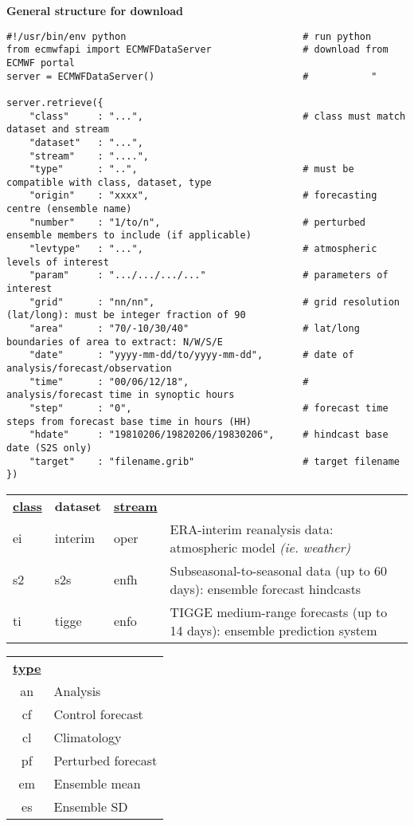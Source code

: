 \documentclass[10pt,fleqn]{article}
\begin{document}
\begin{framed}
\textbf{General structure for download}
\begin{lstlisting}
#!/usr/bin/env python								# run python
from ecmwfapi import ECMWFDataServer				# download from ECMWF portal
server = ECMWFDataServer()							# 			"
    
server.retrieve({
    "class"     : "...",							# class must match dataset and stream
    "dataset"   : "...",
   	"stream"    : "....",							
    "type"      : "..",								# must be compatible with class, dataset, type
    "origin"	: "xxxx",							# forecasting centre (ensemble name)
    "number"	: "1/to/n",							# perturbed ensemble members to include (if applicable)
    "levtype"   : "...",							# atmospheric levels of interest
    "param"     : ".../.../.../..."					# parameters of interest
    "grid"      : "nn/nn",							# grid resolution (lat/long): must be integer fraction of 90
    "area"		: "70/-10/30/40"					# lat/long boundaries of area to extract: N/W/S/E
    "date"      : "yyyy-mm-dd/to/yyyy-mm-dd",		# date of analysis/forecast/observation
    "time"      : "00/06/12/18",					# analysis/forecast time in synoptic hours
    "step"      : "0",								# forecast time steps from forecast base time in hours (HH)
    "hdate"		: "19810206/19820206/19830206",		# hindcast base date (S2S only)
    "target"    : "filename.grib"					# target filename
})
\end{lstlisting}
\end{framed} %

\begin{tabular}{>{\ttfamily}l>{\ttfamily}l>{\ttfamily}ll}
\textbf{\href{http://apps.ecmwf.int/codes/grib/format/mars/class/}{class}} & \textbf{dataset} & \textbf{\href{http://apps.ecmwf.int/codes/grib/format/mars/stream/}{stream}} & \\
ei & interim & oper & ERA-interim reanalysis data: atmospheric model \textit{(ie. weather)}\\
s2 & s2s & enfh & Subseasonal-to-seasonal data (up to 60 days): ensemble forecast hindcasts\\
ti & tigge & enfo & TIGGE medium-range forecasts (up to 14 days): ensemble prediction system\\
\end{tabular}

\begin{tabular}{>{\ttfamily}cl}
\textbf{\href{http://apps.ecmwf.int/codes/grib/format/mars/type/}{type}} & \\
an & Analysis \\
cf & Control forecast\\
cl & Climatology \\
pf & Perturbed forecast\\
em & Ensemble mean\\
es & Ensemble SD\\
\end{tabular}
\end{document}
